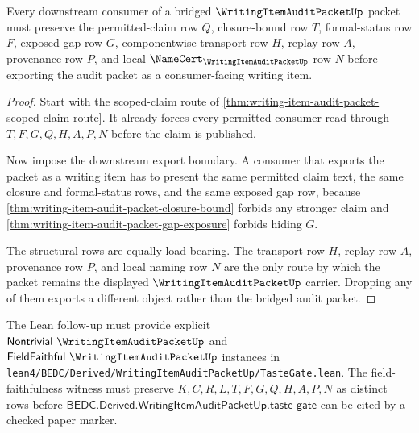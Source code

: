 \begin{theorem}
\label{thm:writing-item-audit-packet-mature-consumer}
Every downstream consumer of a bridged $\WritingItemAuditPacketUp$ packet must preserve the permitted-claim row $Q$, closure-bound row $T$, formal-status row $F$, exposed-gap row $G$, componentwise transport row $H$, replay row $A$, provenance row $P$, and local $\NameCert_{\WritingItemAuditPacketUp}$ row $N$ before exporting the audit packet as a consumer-facing writing item.
\end{theorem}
\begin{proof}
Start with the scoped-claim route of \autoref{thm:writing-item-audit-packet-scoped-claim-route}. It already forces every permitted consumer read through $T,F,G,Q,H,A,P,N$ before the claim is published.

Now impose the downstream export boundary. A consumer that exports the packet as a writing item has to present the same permitted claim text, the same closure and formal-status rows, and the same exposed gap row, because \autoref{thm:writing-item-audit-packet-closure-bound} forbids any stronger claim and \autoref{thm:writing-item-audit-packet-gap-exposure} forbids hiding $G$.

The structural rows are equally load-bearing. The transport row $H$, replay row $A$, provenance row $P$, and local naming row $N$ are the only route by which the packet remains the displayed $\WritingItemAuditPacketUp$ carrier. Dropping any of them exports a different object rather than the bridged audit packet.
\end{proof}



The Lean follow-up must provide explicit $\mathsf{Nontrivial}\ \WritingItemAuditPacketUp$ and $\mathsf{FieldFaithful}\ \WritingItemAuditPacketUp$ instances in \texttt{lean4/BEDC/Derived/WritingItemAuditPacketUp/TasteGate.lean}. The field-faithfulness witness must preserve $K,C,R,L,T,F,G,Q,H,A,P,N$ as distinct rows before $\mathsf{BEDC.Derived.WritingItemAuditPacketUp.taste\_gate}$ can be cited by a checked paper marker.

